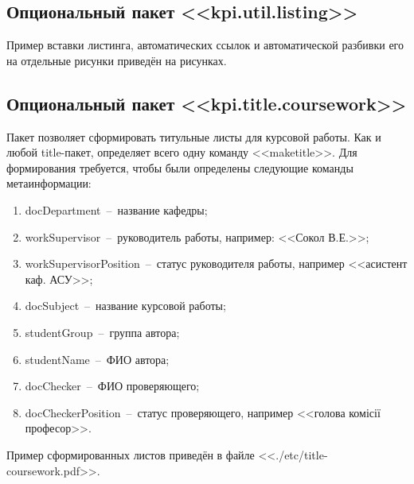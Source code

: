 \subsection{Опциональный пакет <<kpi.util.listing>>}
		Пример вставки листинга, автоматических ссылок и автоматической разбивки его
		на отдельные рисунки приведён на
		рисунках.
\subsection{Опциональный пакет <<kpi.title.coursework>>}
	Пакет позволяет сформировать титульные листы для курсовой работы. Как и любой title-пакет, определяет всего одну команду <<maketitle>>. Для формирования требуется, чтобы были определены следующие команды метаинформации: 
	\begin{enumerate}
	\item docDepartment~--~название кафедры;
	\item workSupervisor~--~руководитель работы, например: <<Сокол В.Е.>>;
	\item workSupervisorPosition~--~статус руководителя работы, например <<асистент каф. АСУ>>;
	\item docSubject~--~название курсовой работы;
	\item studentGroup~--~группа автора;
	\item studentName~--~ФИО автора;
	\item docChecker~--~ФИО проверяющего;
	\item docCheckerPosition~--~статус проверяющего, например <<голова комісії професор>>.	
	\end{enumerate}
	Пример сформированных листов приведён в файле <<./etc/title-coursework.pdf>>.